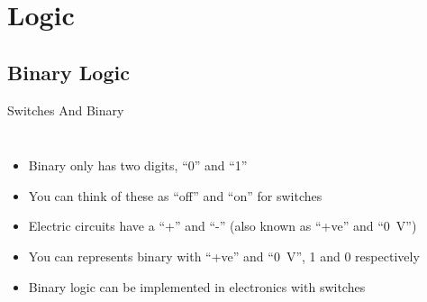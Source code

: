 \documentclass{beamer}
\begin{document}
\section{Logic}

\subsection[Putting It Together]{Binary Logic}

\begin{frame}{Switches And Binary}
  \begin{columns}
    \begin{itemize}
    \item
      Binary only has two digits, ``0'' and ``1'' 
    \item
      You can think of these as ``off'' and ``on'' for switches
    \item
      Electric circuits have a ``+'' and ``-'' (also known as ``+ve'' and ``\SI{0}{\volt}'')
    \item
      You can represents binary with ``+ve'' and ``\SI{0}{\volt}'', 1 and 0 respectively
    \item
      Binary logic can be implemented in electronics with switches
    \end{itemize}
    

\end{columns}
\end{frame}
\end{document}
